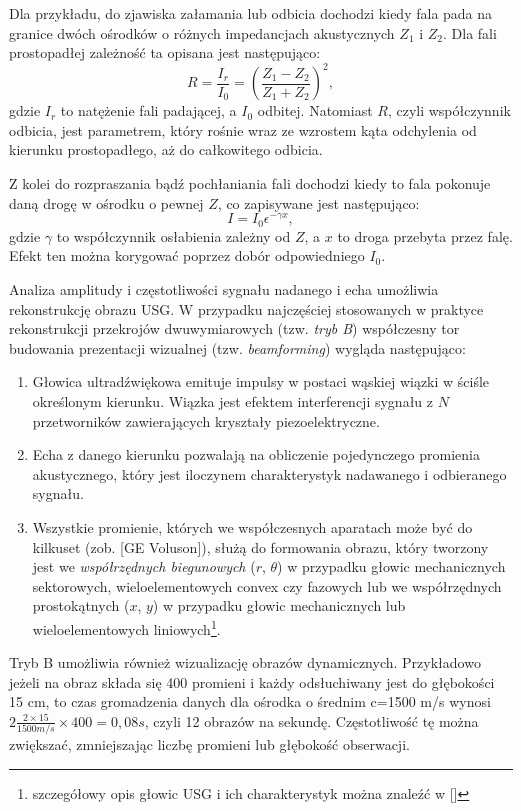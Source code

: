 Dla przykładu, do zjawiska załamania lub odbicia dochodzi kiedy fala pada na granice dwóch ośrodków o różnych impedancjach akustycznych $Z_1$ i $Z_2$. Dla fali prostopadłej zależność ta opisana jest następująco:
\begin{equation}
R = \frac{I_r}{I_0} = \left(\frac{Z_1-Z_2}{Z_1+Z_2}\right)^2,
\end{equation}
gdzie $I_r$ to natężenie fali padającej, a $I_0$ odbitej. Natomiast $R$, czyli współczynnik odbicia, jest parametrem, który rośnie wraz ze wzrostem kąta odchylenia od kierunku prostopadłego, aż do całkowitego odbicia.

Z kolei do rozpraszania bądź pochłaniania fali dochodzi kiedy to fala pokonuje daną drogę w ośrodku o pewnej $Z$, co zapisywane jest następująco:
\begin{equation}
I=I_0 \epsilon^{-\gamma x},
\end{equation}
gdzie $\gamma$ to współczynnik osłabienia zależny od $Z$, a $x$ to droga przebyta przez falę. Efekt ten można korygować poprzez dobór odpowiedniego $I_0$.

Analiza amplitudy i częstotliwości sygnału nadanego i echa umożliwia rekonstrukcję obrazu USG. W przypadku najczęściej stosowanych w praktyce rekonstrukcji przekrojów dwuwymiarowych (tzw. \textit{tryb B}) współczesny tor budowania prezentacji wizualnej (tzw. \textit{beamforming}) wygląda następująco: 
\begin{enumerate}
	\item Głowica ultradźwiękowa emituje impulsy w postaci wąskiej wiązki w ściśle określonym kierunku. Wiązka jest efektem interferencji sygnału z $N$ przetworników zawierających kryształy piezoelektryczne.
	\item Echa z danego kierunku pozwalają na obliczenie pojedynczego promienia akustycznego, który jest iloczynem charakterystyk nadawanego i odbieranego sygnału.
	\item Wszystkie promienie, których we współczesnych aparatach może być do kilkuset (zob. [GE Voluson]), służą do formowania obrazu, który tworzony jest we \textit{współrzędnych biegunowych} ($r$, $\theta$) w przypadku głowic mechanicznych sektorowych, wieloelementowych convex czy fazowych lub we współrzędnych prostokątnych ($x$, $y$) w przypadku głowic mechanicznych lub wieloelementowych liniowych\footnote{szczegółowy opis głowic USG i ich charakterystyk można znaleźć w []}. 
\end{enumerate}

Tryb B umożliwia również wizualizację obrazów dynamicznych. Przykładowo jeżeli na obraz składa się 400 promieni i każdy odsłuchiwany jest do głębokości 15 cm, to czas gromadzenia danych dla ośrodka o średnim c=1500 m/s wynosi $2\frac{2\times15}{1500 m/s}\times400 = 0,08 s$, czyli 12 obrazów na sekundę. Częstotliwość tę można zwiększać, zmniejszając liczbę promieni lub głębokość obserwacji.

